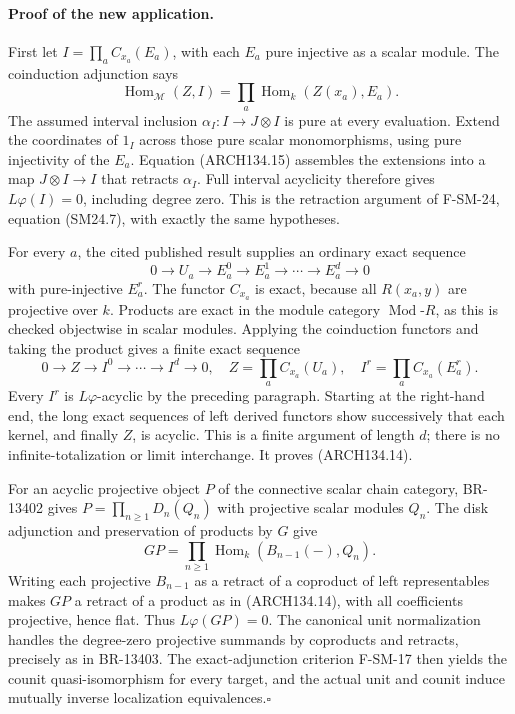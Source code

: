 \paragraph{Proof of the new application.}
First let $I=\prod_a C_{x_a}(E_a)$, with each $E_a$ pure injective
as a scalar module.  The coinduction adjunction says
\[
 \operatorname{Hom}_{\mathcal M}(Z,I)
       =\prod_a\operatorname{Hom}_k(Z(x_a),E_a).
 \tag{ARCH134.15}
\]
The assumed interval inclusion $\alpha_I:I\to J\otimes I$ is pure
at every evaluation.  Extend the coordinates of $1_I$ across those
pure scalar monomorphisms, using pure injectivity of the $E_a$.
Equation (ARCH134.15) assembles the extensions into a map
$J\otimes I\to I$ that retracts $\alpha_I$.  Full interval acyclicity
therefore gives $L\varphi(I)=0$, including degree zero.  This is the
retraction argument of F-SM-24, equation (SM24.7), with exactly the
same hypotheses.

For every $a$, the cited published result supplies an ordinary exact
sequence
\[
 0\longrightarrow U_a\longrightarrow E_a^0\longrightarrow E_a^1
           \longrightarrow\cdots\longrightarrow E_a^d\longrightarrow0
\]
with pure-injective $E_a^r$.  The functor $C_{x_a}$ is exact, because
all $R(x_a,y)$ are projective over $k$.  Products are exact in the
module category $\operatorname{Mod}\!\text{-}R$, as this is checked
objectwise in scalar modules.  Applying the coinduction functors and
taking the product gives a finite exact sequence
\[
 0\longrightarrow Z\longrightarrow I^0\longrightarrow\cdots
               \longrightarrow I^d\longrightarrow0,
 \quad Z=\prod_aC_{x_a}(U_a),\quad
 I^r=\prod_aC_{x_a}(E_a^r).
\]
Every $I^r$ is $L\varphi$-acyclic by the preceding paragraph.  Starting
at the right-hand end, the long exact sequences of left derived
functors show successively that each kernel, and finally $Z$, is
acyclic.  This is a finite argument of length $d$; there is no
infinite-totalization or limit interchange.  It proves (ARCH134.14).

For an acyclic projective object $P$ of the connective scalar chain
category, BR-13402 gives
$P=\prod_{n\ge1}D_n(Q_n)$ with projective scalar modules $Q_n$.
The disk adjunction and preservation of products by $G$ give
\[
 GP=\prod_{n\ge1}\operatorname{Hom}_k(B_{n-1}(-),Q_n).
\]
Writing each projective $B_{n-1}$ as a retract of a coproduct of left
representables makes $GP$ a retract of a product as in (ARCH134.14),
with all coefficients projective, hence flat.  Thus $L\varphi(GP)=0$.
The canonical unit normalization handles the degree-zero projective
summands by coproducts and retracts, precisely as in BR-13403.
The exact-adjunction criterion F-SM-17 then yields the counit
quasi-isomorphism for every target, and the actual unit and counit
induce mutually inverse localization equivalences.\hfill$\square$

